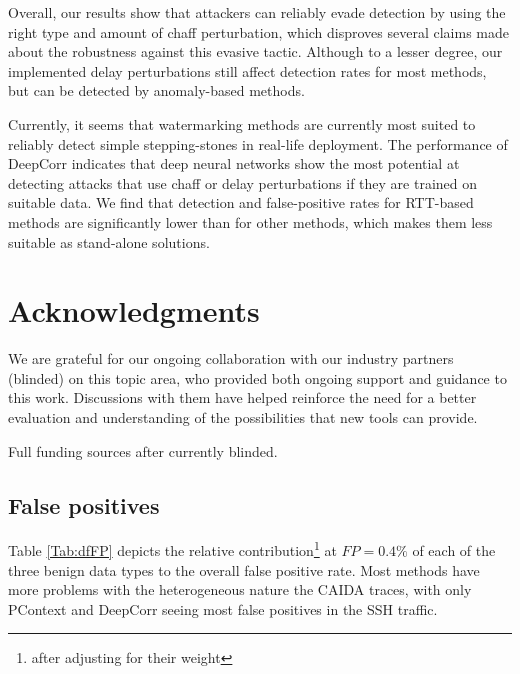 \documentclass[runningheads,11pt]{llncs}\usepackage[]{graphicx}\usepackage[]{color}
\begin{document}
Overall, our results show that attackers can reliably evade detection by using the right type and amount of chaff perturbation, which disproves several claims made about the robustness against this evasive tactic. Although to a lesser degree, our implemented delay perturbations still affect detection rates for most methods, but can be detected by anomaly-based methods. 

Currently, it seems that watermarking methods are currently most suited to reliably detect simple stepping-stones in real-life deployment. The performance of DeepCorr indicates that deep neural networks show the most potential at detecting attacks that use chaff or delay perturbations if they are trained on suitable data. We find that detection and false-positive rates for RTT-based methods are significantly lower than for other methods, which makes them less suitable as stand-alone solutions.

\section{Acknowledgments}

We are grateful for our ongoing collaboration with our industry partners (blinded) on this topic area, who provided both ongoing support and guidance to this work. Discussions with them have helped reinforce the need for a better evaluation and understanding of the possibilities that new tools can provide.

Full funding sources after currently blinded.

%



\appendix


\subsection{False positives}\label{Sec:FPana}

Table \ref{Tab:dfFP} depicts the relative contribution\footnote{after adjusting for their weight} at $FP=0.4\%$ of each of the three benign data types to the overall false positive rate. Most methods have more problems with the heterogeneous nature the CAIDA traces, with only PContext and DeepCorr seeing most false positives in the SSH traffic. 
\end{document}
